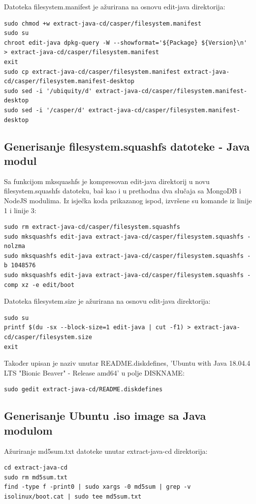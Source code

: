 \documentclass[12pt,vi]{mitthesis}
\begin{document}
\noindent
Datoteka filesystem.manifest je ažurirana na osnovu edit-java direktorija:
\begin{lstlisting}[style=BashInputStyle]
sudo chmod +w extract-java-cd/casper/filesystem.manifest
sudo su
chroot edit-java dpkg-query -W --showformat='${Package} ${Version}\n' > extract-java-cd/casper/filesystem.manifest
exit
sudo cp extract-java-cd/casper/filesystem.manifest extract-java-cd/casper/filesystem.manifest-desktop
sudo sed -i '/ubiquity/d' extract-java-cd/casper/filesystem.manifest-desktop
sudo sed -i '/casper/d' extract-java-cd/casper/filesystem.manifest-desktop
\end{lstlisting}

\subsection*{Generisanje filesystem.squashfs datoteke - Java modul}
\noindent
Sa funkcijom mksquashfs je kompresovan edit-java direktorij u novu filesystem.squashfs datoteku, baš kao i u prethodna dva slučaja sa MongoDB i NodeJS modulima. Iz isječka koda prikazanog ispod, izvršene su komande iz linije 1 i linije 3:
\begin{lstlisting}[style=BashInputStyle]
sudo rm extract-java-cd/casper/filesystem.squashfs
sudo mksquashfs edit-java extract-java-cd/casper/filesystem.squashfs -nolzma 
sudo mksquashfs edit-java extract-java-cd/casper/filesystem.squashfs -b 1048576
sudo mksquashfs edit-java extract-java-cd/casper/filesystem.squashfs -comp xz -e edit/boot
\end{lstlisting}

\noindent
Datoteka filesystem.size je ažurirana na osnovu edit-java direktorija:
\begin{lstlisting}[style=BashInputStyle]
sudo su
printf $(du -sx --block-size=1 edit-java | cut -f1) > extract-java-cd/casper/filesystem.size
exit
\end{lstlisting}

\noindent
Također upisan je naziv unutar README.diskdefines, 'Ubuntu with Java 18.04.4 LTS "Bionic Beaver" - Release amd64' u polje DISKNAME:
\begin{lstlisting}[style=BashInputStyle]
sudo gedit extract-java-cd/README.diskdefines
\end{lstlisting}

\subsection*{Generisanje Ubuntu .iso image sa Java modulom}
\noindent
Ažuriranje md5sum.txt datoteke unutar extract-java-cd direktorija:
\begin{lstlisting}[style=BashInputStyle]
cd extract-java-cd
sudo rm md5sum.txt
find -type f -print0 | sudo xargs -0 md5sum | grep -v isolinux/boot.cat | sudo tee md5sum.txt
\end{lstlisting}
\end{document}
